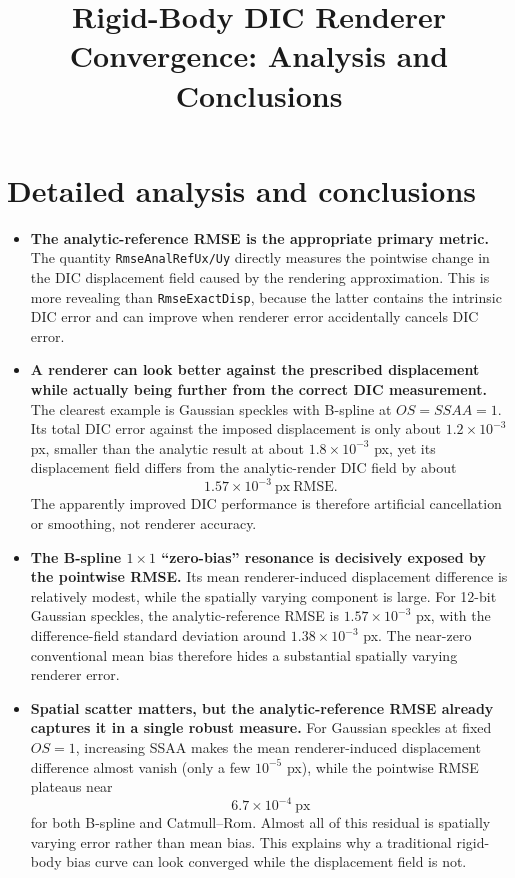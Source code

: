 \documentclass[11pt,a4paper]{article}
\title{Rigid-Body DIC Renderer Convergence: Analysis and Conclusions}
\author{}
\date{}
\begin{document}
\maketitle

\section*{Detailed analysis and conclusions}

\begin{itemize}

\item \textbf{The analytic-reference RMSE is the appropriate primary metric.}
The quantity \texttt{RmseAnalRefUx/Uy} directly measures the pointwise change in the DIC displacement field caused by the rendering approximation. This is more revealing than \texttt{RmseExactDisp}, because the latter contains the intrinsic DIC error and can improve when renderer error accidentally cancels DIC error.

\item \textbf{A renderer can look better against the prescribed displacement while actually being further from the correct DIC measurement.}
The clearest example is Gaussian speckles with B-spline at $OS=SSAA=1$. Its total DIC error against the imposed displacement is only about $1.2\times10^{-3}$ px, smaller than the analytic result at about $1.8\times10^{-3}$ px, yet its displacement field differs from the analytic-render DIC field by about
\[
\boxed{1.57\times10^{-3}\ \mathrm{px\ RMSE}}.
\]
The apparently improved DIC performance is therefore artificial cancellation or smoothing, not renderer accuracy.

\item \textbf{The B-spline $1\times1$ ``zero-bias'' resonance is decisively exposed by the pointwise RMSE.}
Its mean renderer-induced displacement difference is relatively modest, while the spatially varying component is large. For 12-bit Gaussian speckles, the analytic-reference RMSE is $1.57\times10^{-3}$ px, with the difference-field standard deviation around $1.38\times10^{-3}$ px. The near-zero conventional mean bias therefore hides a substantial spatially varying renderer error.

\item \textbf{Spatial scatter matters, but the analytic-reference RMSE already captures it in a single robust measure.}
For Gaussian speckles at fixed $OS=1$, increasing SSAA makes the mean renderer-induced displacement difference almost vanish (only a few $10^{-5}$ px), while the pointwise RMSE plateaus near
\[
\boxed{6.7\times10^{-4}\ \mathrm{px}}
\]
for both B-spline and Catmull--Rom. Almost all of this residual is spatially varying error rather than mean bias. This explains why a traditional rigid-body bias curve can look converged while the displacement field is not.


\end{itemize}
\end{document}
